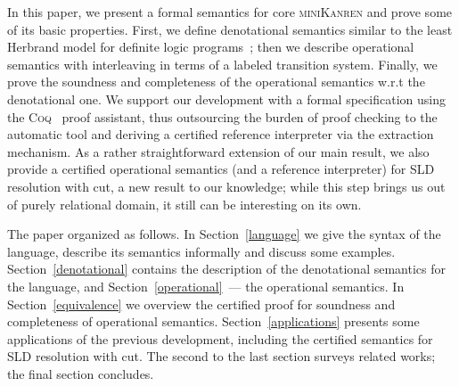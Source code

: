 
In this paper, we present a formal semantics for core \textsc{miniKanren} and prove some of its basic properties. First,
we define denotational semantics similar to the least Herbrand model for definite logic programs~\cite{LHM}; then
we describe operational semantics with interleaving in terms of a labeled transition system. Finally, we prove the soundness and
completeness of the operational semantics w.r.t the denotational one. We support our development with a formal specification
using the \textsc{Coq}~\cite{Coq} proof assistant, thus outsourcing the burden of proof checking to the automatic tool and
deriving a certified reference interpreter via the extraction mechanism. As a rather straightforward extension of our
main result, we also provide a certified operational semantics (and a reference interpreter) for SLD resolution with cut, a new result
to our knowledge; while this step brings us out of purely relational domain, it still can be interesting on its own.

{ \color{red}

The paper organized as follows. In Section~\ref{language} we give the syntax of the language, describe its semantics
informally and discuss some examples. Section~\ref{denotational} contains the description of the denotational semantics for
the language, and Section~\ref{operational}~--- the operational semantics. In Section~\ref{equivalence} we overview the
certified proof for soundness and completeness of operational semantics. Section~\ref{applications} presents some applications of
the previous development, including the certified semantics for SLD resolution with cut. The second to the last section
surveys related works; the final section concludes.

}
